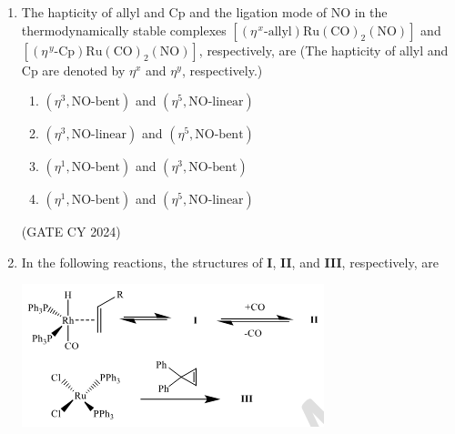 \documentclass[12pt]{article}
\begin{document}
\begin{enumerate}
\item The hapticity of allyl and Cp and the ligation mode of NO in the thermodynamically stable complexes $[(\eta^{\,x}\text{-allyl})\mathrm{Ru}(\mathrm{CO})_2(\mathrm{NO})]$ and $[(\eta^{\,y}\text{-Cp})\mathrm{Ru}(\mathrm{CO})_2(\mathrm{NO})]$, respectively, are  
(The hapticity of allyl and Cp are denoted by $\eta^{x}$ and $\eta^{y}$, respectively.)
\begin{enumerate}
  \item $(\eta^{3}, \text{NO-bent})$ and $(\eta^{5}, \text{NO-linear})$
  \item $(\eta^{3}, \text{NO-linear})$ and $(\eta^{5}, \text{NO-bent})$
  \item $(\eta^{1}, \text{NO-bent})$ and $(\eta^{3}, \text{NO-bent})$
  \item $(\eta^{1}, \text{NO-bent})$ and $(\eta^{5}, \text{NO-linear})$
\end{enumerate}
\hfill (GATE CY 2024)

\item In the following reactions, the structures of \textbf{I}, \textbf{II}, and \textbf{III}, respectively, are

\begin{center}
  \includegraphics[width=\columnwidth]{figs/q39.png}
  
  \label{fig:q39}
\end{center}


\end{enumerate}
\end{document}
